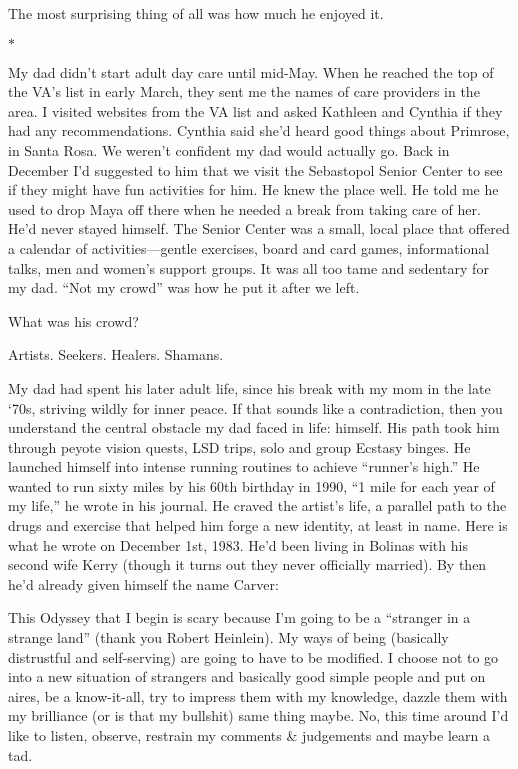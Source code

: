 \documentclass[12pt]{book}
\begin{document}
The most surprising thing of all was how much he enjoyed it.

\begin{center}$*$\end{center}

My dad didn't start adult day care until mid-May. When he reached the top of the VA's list in early March, they sent me the names of care providers in the area. I visited websites from the VA list and asked Kathleen and Cynthia if they had any recommendations. Cynthia said she'd heard good things about Primrose, in Santa Rosa. We weren't confident my dad would actually go. Back in December I'd suggested to him that we visit the Sebastopol Senior Center to see if they might have fun activities for him. He knew the place well. He told me he used to drop Maya off there when he needed a break from taking care of her. He'd never stayed himself. The Senior Center was a small, local place that offered a calendar of activities---gentle exercises, board and card games, informational talks, men and women's support groups. It was all too tame and sedentary for my dad. ``Not my crowd'' was how he put it after we left.

What was his crowd?

Artists. Seekers. Healers. Shamans.

My dad had spent his later adult life, since his break with my mom in the late `70s, striving wildly for inner peace. If that sounds like a contradiction, then you understand the central obstacle my dad faced in life: himself. His path took him through peyote vision quests, LSD trips, solo and group Ecstasy binges. He launched himself into intense running routines to achieve ``runner's high.'' He wanted to run sixty miles by his 60th birthday in 1990, ``1 mile for each year of my life,'' he wrote in his journal. He craved the artist's life, a parallel path to the drugs and exercise that helped him forge a new identity, at least in name. Here is what he wrote on December 1st, 1983. He'd been living in Bolinas with his second wife Kerry (though it turns out they never officially married). By then he'd already given himself the name Carver:

This Odyssey that I begin is scary because I'm going to be a ``stranger in a strange land'' (thank you Robert Heinlein). My ways of being (basically distrustful and self-serving) are going to have to be modified. I choose not to go into a new situation of strangers and basically good simple people and put on aires, be a know-it-all, try to impress them with my knowledge, dazzle them with my brilliance (or is that my bullshit) same thing maybe. No, this time around I'd like to listen, observe, restrain my comments \& judgements and maybe learn a tad.
\end{document}
